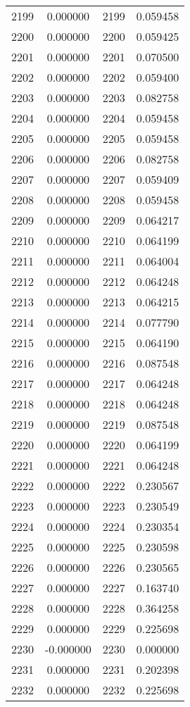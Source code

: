 \documentclass[12pt]{article}
\begin{document}
\begin{longtable}{@{}cccc@{}}
2199 & 0.000000 & 2199 & 0.059458 \\
2200 & 0.000000 & 2200 & 0.059425 \\
2201 & 0.000000 & 2201 & 0.070500 \\
2202 & 0.000000 & 2202 & 0.059400 \\
2203 & 0.000000 & 2203 & 0.082758 \\
2204 & 0.000000 & 2204 & 0.059458 \\
2205 & 0.000000 & 2205 & 0.059458 \\
2206 & 0.000000 & 2206 & 0.082758 \\
2207 & 0.000000 & 2207 & 0.059409 \\
2208 & 0.000000 & 2208 & 0.059458 \\
2209 & 0.000000 & 2209 & 0.064217 \\
2210 & 0.000000 & 2210 & 0.064199 \\
2211 & 0.000000 & 2211 & 0.064004 \\
2212 & 0.000000 & 2212 & 0.064248 \\
2213 & 0.000000 & 2213 & 0.064215 \\
2214 & 0.000000 & 2214 & 0.077790 \\
2215 & 0.000000 & 2215 & 0.064190 \\
2216 & 0.000000 & 2216 & 0.087548 \\
2217 & 0.000000 & 2217 & 0.064248 \\
2218 & 0.000000 & 2218 & 0.064248 \\
2219 & 0.000000 & 2219 & 0.087548 \\
2220 & 0.000000 & 2220 & 0.064199 \\
2221 & 0.000000 & 2221 & 0.064248 \\
2222 & 0.000000 & 2222 & 0.230567 \\
2223 & 0.000000 & 2223 & 0.230549 \\
2224 & 0.000000 & 2224 & 0.230354 \\
2225 & 0.000000 & 2225 & 0.230598 \\
2226 & 0.000000 & 2226 & 0.230565 \\
2227 & 0.000000 & 2227 & 0.163740 \\
2228 & 0.000000 & 2228 & 0.364258 \\
2229 & 0.000000 & 2229 & 0.225698 \\
2230 & -0.000000 & 2230 & 0.000000 \\
2231 & 0.000000 & 2231 & 0.202398 \\
2232 & 0.000000 & 2232 & 0.225698 \\

\end{longtable}
\end{document}
